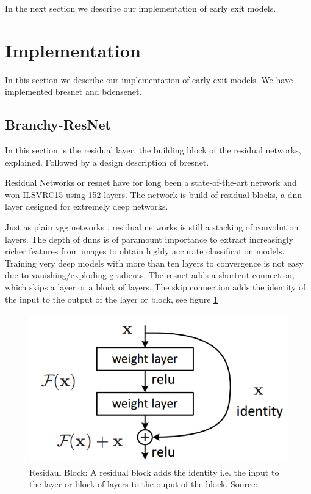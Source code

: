 In the next section we describe our implementation of early exit models.

\section{Implementation} \label{sec:ee-implementation}

In this section we describe our implementation of early exit models. We have implemented \gls{bresnet} and \gls{bdensenet}.  

\subsection{Branchy-ResNet} 

In this section is the residual layer, the building block of the residual networks, explained. Followed by a design description of \gls{bresnet}.

Residual Networks or \gls{resnet} \cite{he_deep_2015} have for long been a state-of-the-art network and won ILSVRC15 using 152 layers. The network is build of residual blocks, a \gls{dnn} layer designed for extremely deep networks. 

Just as plain \gls{vgg} networks \cite{simonyan_very_2015}, residual networks is still a stacking of convolution layers. The depth of \gls{dnn}s is of paramount importance to extract increasingly richer features from images to obtain highly accurate classification models. Training very deep models with more than ten layers to convergence is not easy due to vanishing/exploding gradients. The \gls{resnet} adds a shortcut connection, which skips a layer or a block of layers. The skip connection adds the identity of the input to the output of the layer or block, see figure \ref{fig:residualblock}

\begin{figure}
	\centering
	\includegraphics[width=.5\linewidth]{figures/models/residualblock}
	\caption[Residual Block]{Residaul Block: A residual block adds the identity i.e. the input to the layer or block of layers to the ouput of the block. Source:  \cite{he_deep_2015}}
	\label{fig:residualblock}
\end{figure}

